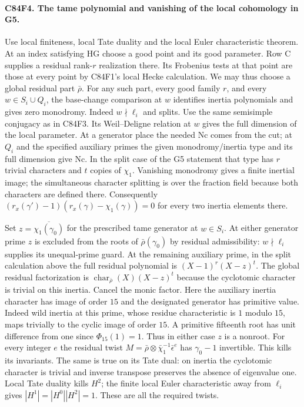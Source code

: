 \paragraph{C84F4. The tame polynomial and vanishing of the local cohomology in G5.}
Use local finiteness, local Tate duality and the local Euler
characteristic theorem. At an index satisfying $\mathrm{HG}$ choose
a good point and its good parameter. Row C supplies a residual
rank-$r$ realization there. Its Frobenius tests at that point
are those at every point by C84F1's local Hecke calculation.
We may thus choose a global residual part $\bar\rho$. For any
such part, every good family $r$, and every $w\in S_i\cup Q_i$,
the base-change comparison at $w$ identifies inertia polynomials
and gives zero monodromy. Indeed $w\nmid\ell_i$ and splits.
Use the same semisimple conjugacy as in C84F3. Its
Weil--Deligne relation at $w$ gives the full dimension of the
local parameter. At a generator place the needed $\mathrm{Nc}$
comes from the cut; at $Q_i$ and the specified auxiliary primes
the given monodromy/inertia type and its full dimension give
$\mathrm{Nc}$. In the split case of the G5 statement that type
has $r$ trivial characters and $t$ copies of $\chi_1$. Vanishing
monodromy gives a finite inertial image; the simultaneous
character splitting is over the fraction field because both
characters are defined there. Consequently
$(r_x(\gamma')-1)(r_x(\gamma)-\chi_1(\gamma))=0$ for every
two inertia elements there.

Set $z=\overline{\chi_1(\gamma_0)}$ for the prescribed tame
generator at $w\in S_i$. At either generator prime $z$ is excluded
from the roots of $\bar\rho(\gamma_0)$ by residual admissibility:
$w\nmid\ell_i$ supplies its unequal-prime guard. At the remaining
auxiliary prime, in the split calculation above the full residual
polynomial is $(X-1)^r(X-z)^t$. The global residual
factorization is $\operatorname{char}_{\bar\rho}(X)(X-z)^t$
because the cyclotomic character is trivial on this inertia.
Cancel the monic factor. Here the auxiliary inertia character
has image of order $15$ and the designated generator has
primitive value. Indeed wild inertia at this prime, whose
residue characteristic is $1$ modulo $15$, maps trivially to
the cyclic image of order $15$. A primitive fifteenth root has
unit difference from one since $\Phi_{15}(1)=1$. Thus in either
case $z$ is a nonroot. For every integer $e$ the residual twist
$M=\bar\rho\otimes\bar\chi_1^{-1}\bar\epsilon^{e}$ has
$\gamma_0-1$ invertible. This kills its invariants. The same is
true on its Tate dual: on inertia the cyclotomic character is
trivial and inverse transpose preserves the absence of eigenvalue
one. Local Tate duality kills $H^2$; the finite local Euler
characteristic away from $\ell_i$ gives
$|H^1|=|H^0||H^2|=1$. These are all the required twists.

